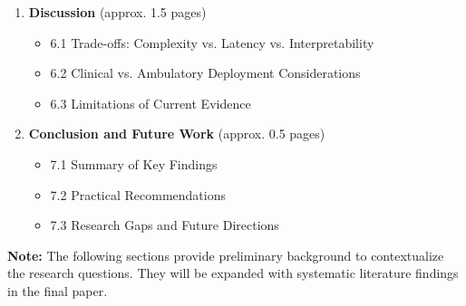 \begin{enumerate}
  \item \textbf{Discussion} (approx. 1.5 pages)
    \begin{itemize}
      \item 6.1 Trade-offs: Complexity vs. Latency vs. Interpretability
      \item 6.2 Clinical vs. Ambulatory Deployment Considerations
      \item 6.3 Limitations of Current Evidence
    \end{itemize}
    
  \item \textbf{Conclusion and Future Work} (approx. 0.5 pages)
    \begin{itemize}
      \item 7.1 Summary of Key Findings
      \item 7.2 Practical Recommendations
      \item 7.3 Research Gaps and Future Directions
    \end{itemize}
\end{enumerate}

\vspace{1em}
\noindent\textbf{Note:} The following sections provide preliminary background 
to contextualize the research questions. They will be expanded with 
systematic literature findings in the final paper.
\vspace{0.5em}
